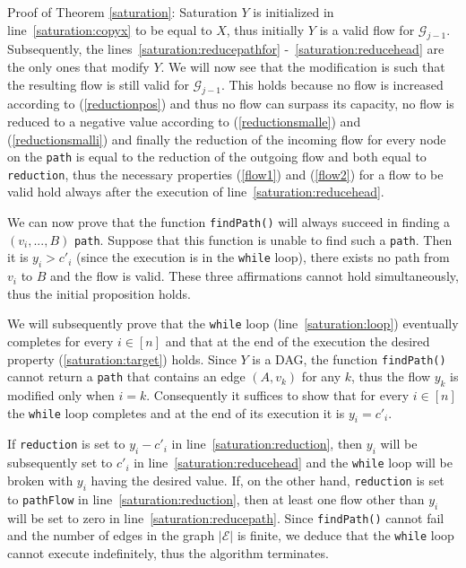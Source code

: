 \begin{sepproof}{Proof of Theorem \ref{saturation}: Saturation}
  $Y$ is initialized in line~\ref{saturation:copyx} to be equal to $X$, thus initially $Y$ is a valid flow for
  $\mathcal{G}_{j-1}$. Subsequently, the lines~\ref{saturation:reducepathfor} -~\ref{saturation:reducehead} are the only ones
  that modify $Y$. We will now see that the modification is such that the resulting flow is still valid for
  $\mathcal{G}_{j-1}$. This holds because no flow is increased according to (\ref{reductionpos}) and thus no flow can surpass
  its capacity, no flow is reduced to a negative value according to (\ref{reductionsmalle}) and (\ref{reductionsmalli}) and
  finally the reduction of the incoming flow for every node on the \texttt{path} is equal to the reduction of the outgoing
  flow and both equal to \texttt{reduction}, thus the necessary properties (\ref{flow1}) and (\ref{flow2}) for a flow to be
  valid hold always after the execution of line~\ref{saturation:reducehead}.
  
  We can now prove that the function \texttt{findPath()} will always succeed in finding a $\left(v_i, ..., B\right)$
  \texttt{path}. Suppose that this function is unable to find such a \texttt{path}. Then it is $y_i > c'_i$ (since the
  execution is in the \texttt{while} loop), there exists no path from $v_i$ to $B$ and the flow is valid. These three
  affirmations cannot hold simultaneously, thus the initial proposition holds.

  We will subsequently prove that the \texttt{while} loop (line~\ref{saturation:loop}) eventually completes for every $i \in
  [n]$ and that at the end of the execution the desired property (\ref{saturation:target}) holds. Since $Y$ is a DAG, the
  function \texttt{findPath()} cannot return a \texttt{path} that contains an edge $\left(A, v_k\right)$ for any $k$, thus the
  flow $y_k$ is modified only when $i = k$. Consequently it suffices to show that for every $i \in [n]$ the \texttt{while}
  loop completes and at the end of its execution it is $y_i = c'_i$.

  If \texttt{reduction} is set to $y_i - c'_i$ in line~\ref{saturation:reduction}, then $y_i$ will be subsequently set to
  $c'_i$ in line~\ref{saturation:reducehead} and the \texttt{while} loop will be broken with $y_i$ having the desired value.
  If, on the other hand, \texttt{reduction} is set to \texttt{pathFlow} in line~\ref{saturation:reduction}, then at least one
  flow other than $y_i$ will be set to zero in line~\ref{saturation:reducepath}. Since \texttt{findPath()} cannot fail and the
  number of edges in the graph $|\mathcal{E}|$ is finite, we deduce that the \texttt{while} loop cannot execute indefinitely,
  thus the algorithm terminates.


\end{sepproof}

